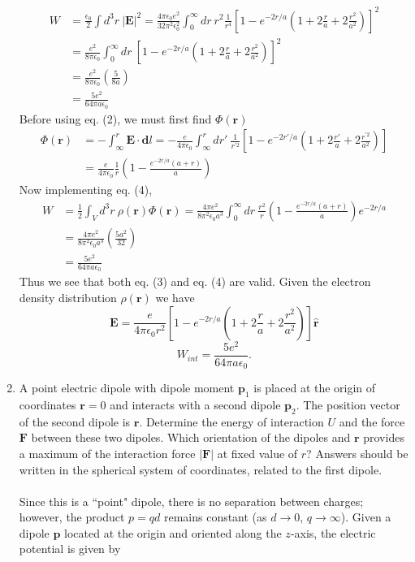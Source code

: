 \documentclass[11pt,letterpaper]{article}
\newcommand{\vect}[1]{\mathbf{#1}}
\begin{document}
\begin{enumerate}
\begin{align*}W&=\frac{\epsilon_0}{2}\int{d^3r\ |\vect E|^2}=\frac{4\pi\epsilon_0e^2}{32\pi^2\epsilon_0^2}\int_{0}^{\infty}{dr\ r^2  \frac{1}{r^4}\left[1-e^{-2r/a}\left(1+2\frac{r}{a}+2\frac{r^2}{a^2}\right)\right]^2}\\
&=\frac{e^2}{8\pi\epsilon_0}\int_{0}^{\infty}{dr\ \left[1-e^{-2r/a}\left(1+2\frac{r}{a}+2\frac{r^2}{a^2}\right)\right]^2}\\
&=\frac{e^2}{8\pi\epsilon_0}\left(\frac{5}{8a}\right)\\
&=\frac{5e^2}{64\pi a\epsilon_0}
\end{align*}
Before using eq. (2), we must first find $\Phi(\vect r)$
\begin{align*}\Phi(\vect r) &= -\int_{\infty}^{r}{\vect E\cdot \vect dl} = -\frac{e}{4\pi\epsilon_0}\int_{\infty}^{r}{dr'\ \frac{1}{r^{'2}}\left[1-e^{-2r'/a}\left(1+2\frac{r'}{a}+2\frac{r^{'2}}{a^2}\right)\right]}\\
&=\frac{e}{4\pi\epsilon_0}\frac{1}{r}\left(1-\frac{e^{-2r/a}(a+r)}{a}\right)
\end{align*}
Now implementing eq. (4),
\begin{align*}W &= \frac{1}{2}\int_{V}{d^3r\ \rho(\vect r)\Phi(\vect r)} = \frac{4\pi e^2}{8\pi^2\epsilon_0 a^3}\int_{0}^{\infty}{dr\ \frac{r^2}{r}\left(1-\frac{e^{-2r/a}(a+r)}{a}\right)e^{-2r/a}}\\
&=\frac{4\pi e^2}{8\pi^2\epsilon_0a^3}\left(\frac{5a^2}{32}\right)\\
&=\frac{5e^2}{64\pi a\epsilon_0}
\end{align*}
Thus we see that both eq. (3) and eq. (4) are valid. Given the electron density distribution $\rho(\vect r)$ we have
$$\vect E= \frac{e}{4\pi\epsilon_0 r^2}\left[1-e^{-2r/a}\left(1+2\frac{r}{a}+2\frac{r^2}{a^2}\right)\right]\hat{\vect r}$$
$$W_{int} = \frac{5e^2}{64\pi a\epsilon_0}.$$
\item A point electric dipole with dipole moment $\vect p_1$ is placed at the origin of coordinates $\vect r =0$ and interacts with a second dipole $\vect p_2$. The position vector of the second dipole is $\vect r$. Determine the energy of interaction $U$ and the force $\vect F$ between these two dipoles. Which orientation of the dipoles and $\vect r$ provides a maximum of the interaction force $|\vect F|$ at fixed value of $r$? Answers should be written in the spherical system of coordinates, related to the first dipole.
\\ \\Since this is a ``point" dipole, there is no separation between charges; however, the product $p = qd$ remains constant (as $d\rightarrow0$, $q\rightarrow\infty$). Given a dipole $\vect p$ located at the origin and oriented along the $z$-axis, the electric potential is given by

\end{enumerate}
\end{document}

